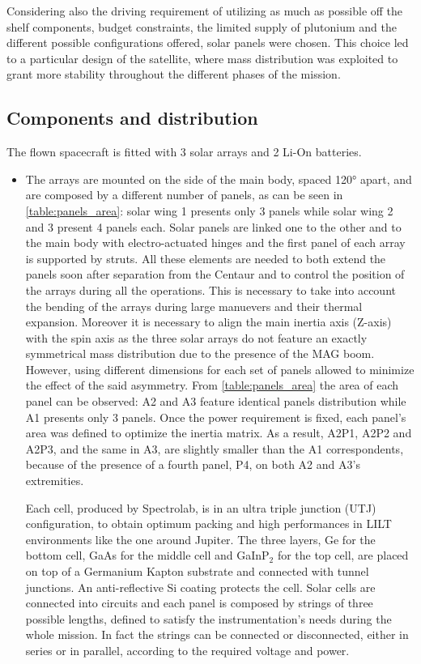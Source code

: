 Considering also the driving requirement of utilizing as much as possible off the shelf components, budget constraints, the limited supply of plutonium and the different possible configurations offered, solar panels were chosen. This choice led to a particular design of the satellite, where mass distribution was exploited to grant more stability throughout the different phases of the mission.  

\subsection{Components and distribution}
\label{subsec:components_and_distribution}

The flown spacecraft is fitted with 3 solar arrays and 2 Li-On batteries. 

\begin{itemize}

\item The arrays are mounted on the side of the main body, spaced 120° apart, and are composed by a different number of panels, as can be seen in \autoref{table:panels_area}: solar wing 1 presents only 3 panels while solar wing 2 and 3 present 4 panels each. Solar panels are linked one to the other and to the main body with electro-actuated hinges and the first panel of each array is supported by struts. All these elements are needed to both extend the panels soon after separation from the Centaur and to control the position of the arrays during all the operations. This is necessary to take into account the bending of the arrays during large manuevers and their thermal expansion. Moreover it is necessary to align the main inertia axis (Z-axis) with the spin axis as the three solar arrays do not feature an exactly symmetrical mass distribution due to the presence of the MAG boom. However, using different dimensions for each set of panels allowed to minimize the effect of the said asymmetry. From \autoref{table:panels_area} the area of each panel can be observed: A2 and A3 feature identical panels distribution while A1 presents only 3 panels. Once the power requirement is fixed, each panel's area was defined to optimize the inertia matrix. As a result, A2P1, A2P2 and A2P3, and the same in A3, are slightly smaller than the A1 correspondents, because of the presence of a fourth panel, P4, on both A2 and A3's extremities.

Each cell, produced by Spectrolab, is in an ultra triple junction (UTJ) configuration, to obtain optimum packing and high performances in LILT environments like the one around Jupiter. The three layers, Ge for the bottom cell, GaAs for the middle cell and GaInP$_2$ for the top cell, are placed on top of a Germanium Kapton substrate and connected with tunnel junctions. An anti-reflective Si coating protects the cell. 
Solar cells are connected into circuits and each panel is composed by strings of three possible lengths, defined to satisfy the instrumentation's needs during the whole mission. In fact the strings  can be connected or disconnected, either in series or in parallel, according to the required voltage and power. 


\end{itemize}
